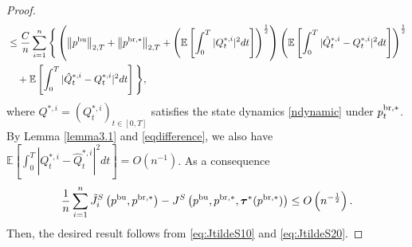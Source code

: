 \documentclass[11pt]{article}
\numberwithin{equation}{section}
\begin{document}
\begin{proof}
\begin{align*}
	     		&\leq \frac{C}{n}\sum_{i=1}^n\Bigg\{\left(\left\Vert p^{{\rm bu}}\right\Vert_{2,T}+\left\Vert p^{{\rm br},*}\right\Vert_{2,T}+\left( \mathbb{E}\left[\int_0^T|Q_t^{*,i}|^2dt\right]\right)^{\frac{1}{2}}\right)\left( \mathbb{E}\left[\int_0^T|\hat{Q}_t^{*,i}-Q_t^{*,i}|^2dt\right]\right)^{\frac{1}{2}}\\
	     		&\quad +\mathbb{E}\left[\int_0^T|\hat{Q}_t^{*,i}-Q_t^{*, i}|^2dt\right]\Bigg\},
     		\end{align*}
where $Q^{*,i}=(Q_t^{*,i})_{t\in[0,T]}$ satisfies the state dynamics \eqref{ndynamic} under $p_t^{{\rm br},*}$.
By Lemma \ref{lemma3.1} and \eqref{eqdifference}, we also have $\mathbb{E}[\int_0^T|Q_t^{*,i}-\hat{Q}_t^{*,i}|^2dt]=O(n^{-1})$. As a consequence
\begin{align}\label{eq:JtildeS20}
\frac{1}{n}\sum_{i=1}^n\tilde{J}_i^S\left(p^{{\rm bu}},p^{{\rm br},*}\right)-J^S\left(p^{{\rm bu}},p^{{\rm br},*}, \boldsymbol{\tau }^*(p^{{\rm br},*})\right)\leq O\left(n^{-\frac{1}{2}}\right).
\end{align}
Then, the desired result follows from \eqref{eq:JtildeS10} and \eqref{eq:JtildeS20}.
 \end{proof}
 
\end{document}
